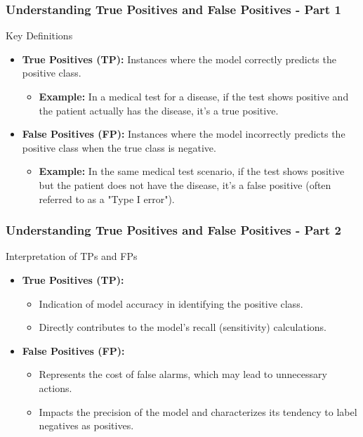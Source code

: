 \documentclass[aspectratio=169]{beamer}
\begin{document}
\begin{frame}[fragile]
  \frametitle{Understanding True Positives and False Positives - Part 1}
  \begin{block}{Key Definitions}
    \begin{itemize}
      \item \textbf{True Positives (TP):} Instances where the model correctly predicts the positive class.
      \begin{itemize}
        \item \textbf{Example:} In a medical test for a disease, if the test shows positive and the patient actually has the disease, it's a true positive.
      \end{itemize}
      \item \textbf{False Positives (FP):} Instances where the model incorrectly predicts the positive class when the true class is negative.
      \begin{itemize}
        \item \textbf{Example:} In the same medical test scenario, if the test shows positive but the patient does not have the disease, it's a false positive (often referred to as a "Type I error").
      \end{itemize}
    \end{itemize}
  \end{block}
\end{frame}

\begin{frame}[fragile]
  \frametitle{Understanding True Positives and False Positives - Part 2}
  \begin{block}{Interpretation of TPs and FPs}
    \begin{itemize}
      \item \textbf{True Positives (TP):}
      \begin{itemize}
        \item Indication of model accuracy in identifying the positive class.
        \item Directly contributes to the model's recall (sensitivity) calculations.
      \end{itemize}
      \item \textbf{False Positives (FP):}
      \begin{itemize}
        \item Represents the cost of false alarms, which may lead to unnecessary actions.
        \item Impacts the precision of the model and characterizes its tendency to label negatives as positives.
      \end{itemize}
    \end{itemize}
  \end{block}
\end{frame}
\end{document}
